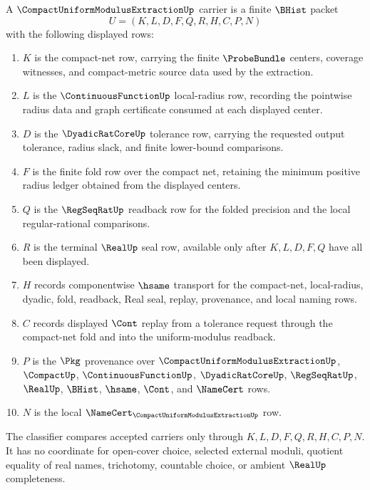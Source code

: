 \begin{definition}
\label{def:compact-uniform-modulus-extraction-carrier}
A $\CompactUniformModulusExtractionUp$ carrier is a finite $\BHist$ packet
$$
U=(K,L,D,F,Q,R,H,C,P,N)
$$
with the following displayed rows:
\begin{enumerate}
\item $K$ is the compact-net row, carrying the finite $\ProbeBundle$ centers, coverage witnesses, and compact-metric source data used by the extraction.
\item $L$ is the $\ContinuousFunctionUp$ local-radius row, recording the pointwise radius data and graph certificate consumed at each displayed center.
\item $D$ is the $\DyadicRatCoreUp$ tolerance row, carrying the requested output tolerance, radius slack, and finite lower-bound comparisons.
\item $F$ is the finite fold row over the compact net, retaining the minimum positive radius ledger obtained from the displayed centers.
\item $Q$ is the $\RegSeqRatUp$ readback row for the folded precision and the local regular-rational comparisons.
\item $R$ is the terminal $\RealUp$ seal row, available only after $K,L,D,F,Q$ have all been displayed.
\item $H$ records componentwise $\hsame$ transport for the compact-net, local-radius, dyadic, fold, readback, Real seal, replay, provenance, and local naming rows.
\item $C$ records displayed $\Cont$ replay from a tolerance request through the compact-net fold and into the uniform-modulus readback.
\item $P$ is the $\Pkg$ provenance over $\CompactUniformModulusExtractionUp$, $\CompactUp$, $\ContinuousFunctionUp$, $\DyadicRatCoreUp$, $\RegSeqRatUp$, $\RealUp$, $\BHist$, $\hsame$, $\Cont$, and $\NameCert$ rows.
\item $N$ is the local $\NameCert_{\CompactUniformModulusExtractionUp}$ row.
\end{enumerate}
The classifier compares accepted carriers only through $K,L,D,F,Q,R,H,C,P,N$. It has no coordinate for open-cover choice, selected external moduli, quotient equality of real names, trichotomy, countable choice, or ambient $\RealUp$ completeness.
\end{definition}

